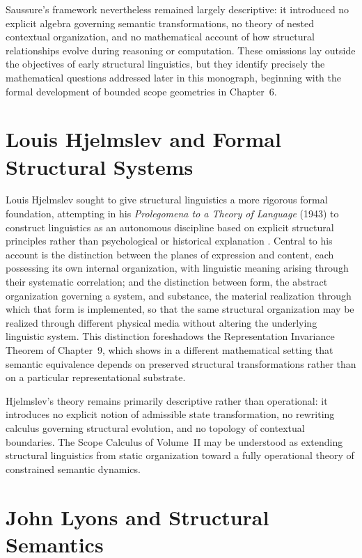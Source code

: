 \documentclass[11pt,twoside,openright]{book}
\numberwithin{equation}{chapter}
\theoremstyle{definition}
\theoremstyle{plain}
\theoremstyle{remark}
\theoremstyle{definition}
\begin{document}
Saussure's framework nevertheless remained largely descriptive: it
introduced no explicit algebra governing semantic transformations, no
theory of nested contextual organization, and no mathematical account of
how structural relationships evolve during reasoning or computation.
These omissions lay outside the objectives of early structural
linguistics, but they identify precisely the mathematical questions
addressed later in this monograph, beginning with the formal development
of bounded scope geometries in Chapter~6.

\section{Louis Hjelmslev and Formal Structural Systems}

Louis Hjelmslev sought to give structural linguistics a more rigorous
formal foundation, attempting in his \emph{Prolegomena to a Theory of
Language} (1943) to construct linguistics as an autonomous discipline
based on explicit structural principles rather than psychological or
historical explanation \cite{Hjelmslev1943}. Central to his account is the
distinction between the planes of expression and content, each possessing
its own internal organization, with linguistic meaning arising through
their systematic correlation; and the distinction between form, the
abstract organization governing a system, and substance, the material
realization through which that form is implemented, so that the same
structural organization may be realized through different physical media
without altering the underlying linguistic system. This distinction
foreshadows the Representation Invariance Theorem of Chapter~9, which
shows in a different mathematical setting that semantic equivalence
depends on preserved structural transformations rather than on a
particular representational substrate.

Hjelmslev's theory remains primarily descriptive rather than operational:
it introduces no explicit notion of admissible state transformation, no
rewriting calculus governing structural evolution, and no topology of
contextual boundaries. The Scope Calculus of Volume~II may be understood
as extending structural linguistics from static organization toward a
fully operational theory of constrained semantic dynamics.

\section{John Lyons and Structural Semantics}
\end{document}
